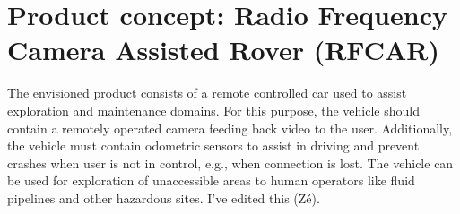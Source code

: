 \section{Product concept: Radio Frequency Camera Assisted Rover (RFCAR)}
\label{sec:orge7b0dc6}
The envisioned product consists of a remote controlled car used to assist
exploration and maintenance domains. For this purpose, the vehicle should contain a
remotely operated camera feeding back video to the user.
Additionally, the
vehicle must contain odometric sensors to assist in driving and prevent
crashes when user is not in control, e.g., when connection is lost.
The vehicle can be used for exploration of unaccessible areas to human operators
like fluid pipelines and other hazardous sites.
I've edited this (Zé).

